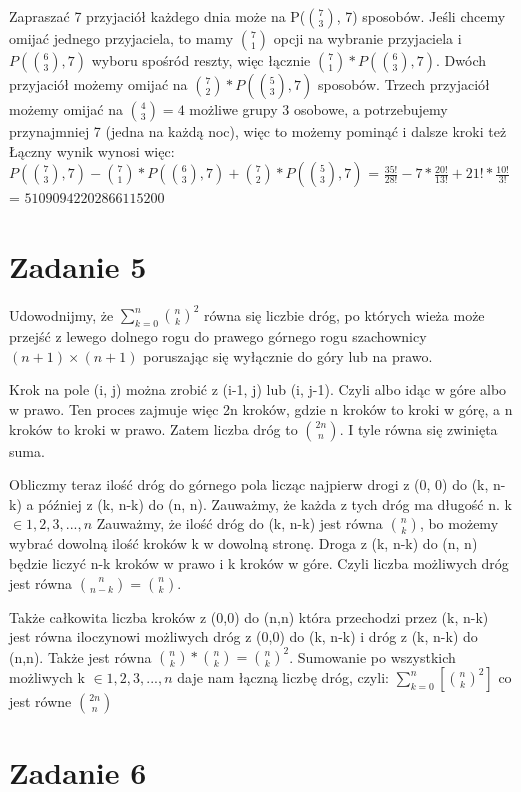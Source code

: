 \documentclass[12pt]{article}
\begin{document}
Zapraszać 7 przyjaciół każdego dnia może na P($\binom{7}{3}$, 7) sposobów. 
Jeśli chcemy omijać jednego przyjaciela, to mamy $\binom{7}{1}$ opcji na wybranie przyjaciela i $P(\binom{6}{3}, 7)$ wyboru spośród reszty, więc łącznie $\binom{7}{1} * P(\binom{6}{3}, 7)$.
Dwóch przyjaciół możemy omijać na $\binom{7}{2} * P(\binom{5}{3}, 7)$ sposobów.
Trzech przyjaciół możemy omijać na $\binom{4}{3} = 4$ możliwe grupy 3 osobowe, a potrzebujemy przynajmniej 7 (jedna na każdą noc), więc to możemy pominąć i dalsze kroki też
Łączny wynik wynosi więc:
$P(\binom{7}{3}, 7) - \binom{7}{1} * P(\binom{6}{3}, 7) + \binom{7}{2} * P(\binom{5}{3}, 7)$ =
$\frac{35!}{28!} - 7*\frac{20!}{13!} + 21! * \frac{10!}{3!}$ = 
$51090942202866115200$

\section{Zadanie 5}
Udowodnijmy, że $\sum_{k=0}^n \binom{n}{k}^2$ równa się liczbie dróg, po których wieża może przejść z lewego dolnego rogu do prawego górnego rogu szachownicy $(n+1) \times (n+1)$ poruszając się wyłącznie do góry lub na prawo.

Krok na pole (i, j) można zrobić z (i-1, j) lub (i, j-1). Czyli albo idąc w góre albo w prawo. Ten proces zajmuje więc 2n kroków, gdzie n kroków to kroki w górę, a n kroków to kroki w prawo. Zatem liczba dróg to $\binom{2n}{n}$. I tyle równa się zwinięta suma. 

Obliczmy teraz ilość dróg do górnego pola licząc najpierw drogi z (0, 0) do (k, n-k) a później z (k, n-k) do (n, n). Zauważmy, że każda z tych dróg ma długość n. k $\in {1, 2, 3, ..., n}$ 
Zauważmy, że ilość dróg do (k, n-k) jest równa $\binom{n}{k}$, bo możemy wybrać dowolną ilość kroków k w dowolną stronę. Droga z (k, n-k) do (n, n) będzie liczyć n-k kroków w prawo i k kroków w góre. Czyli liczba możliwych dróg jest równa $\binom{n}{n-k}=\binom{n}{k}$.

Także całkowita liczba kroków z (0,0) do (n,n) która przechodzi przez (k, n-k) jest równa iloczynowi możliwych dróg z (0,0) do (k, n-k) i dróg z (k, n-k) do (n,n). Także jest równa $\binom{n}{k} * \binom{n}{k} = \binom{n}{k}^2$.
Sumowanie po wszystkich możliwych k $\in {1, 2, 3, ..., n}$ daje nam łączną liczbę dróg, czyli:
$\sum_{k=0}^{n} [\binom{n}{k}^2]$ co jest równe $\binom{2n}{n}$

\section{Zadanie 6}
\end{document}
